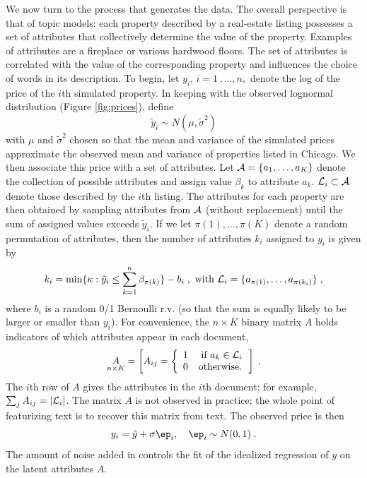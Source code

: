 \documentclass[10pt]{article}
\begin{document}
We now turn to the process that generates the data.  The overall perspective is that of topic models: each property described by a real-estate listing possesses a set of attributes that collectively determine the value of the property.   Examples of attributes are a fireplace or various hardwood floors.  The set of attributes is correlated with the value of the corresponding property and influences the choice of words in its description.  To begin, let $y_i, \, i = 1\,,\ldots, n,$ denote the log of the price of the $i$th simulated property.  In keeping with the observed lognormal distribution (Figure \ref{fig:prices}), define
\begin{equation}
	\tilde{y}_i \sim N(\mu, \tilde\sigma^2)
\end{equation}
with $\mu $ and $\tilde\sigma^2$ chosen so that the mean and variance of the simulated prices approximate the observed mean and variance of properties listed in Chicago.  We then associate this price with a set of attributes.  Let ${\cal A} = \{a_1,\ldots, a_K\}$ denote the collection of  possible attributes and assign value $\beta_k$ to attribute $a_k$.  ${\cal L}_i \subset {\cal A}$ denote those described by the $i$th listing.  The attributes for each property are then obtained by sampling attributes from $\cal A$ (without replacement) until the sum of assigned values exceeds $\tilde{y}_i$.  If we let $\pi(1), \ldots, \pi(K)$ denote a random permutation of attributes, then the number of attributes $k_i$ assigned to $y_i$ is given by
\begin{equation}
	k_i = \min \{ \kappa:  \tilde{y}_i \le \sum_{k=1}^{\kappa} \beta_{\pi(k)} \} - b_i \;,
	\mbox{ with }
	{\cal L}_i = \{a_{\pi(1)}, \ldots, a_{\pi(k_i)} \} \;,
\end{equation}
where $b_i$ is a random 0/1 Bernoulli r.v. (so that the sum is equally likely to be larger or smaller than $y_i$).  For convenience,  the $n \times K$ binary matrix $A$ holds indicators of which attributes appear in each document,
\begin{equation}
  \underset{n \times K}{A} = \left[ A_{ij} =
              \left\{ \begin{array}{cc} 1 & \mbox{ if } a_k \in {\cal L}_i \cr 0 & \mbox{otherwise.} 
                       \end{array} \right. \right]  \;.
\end{equation}
The $i$th row of $A$ gives the attributes in the $i$th document; for example, $\sum_j A_{ij} = |{\cal L}_i|$. The matrix $A$ is not observed in practice; the whole point of featurizing text is to recover this matrix from text.  The observed price is then 
\begin{equation}
	y_i = \tilde{y} + \sigma \ep_i, \quad \ep_i \sim N(0,1) \;.
\label{eq:y}
\end{equation}
The amount of noise added  in  controls the fit of the idealized regression of $y$ on the latent attributes $A$.
\end{document}
